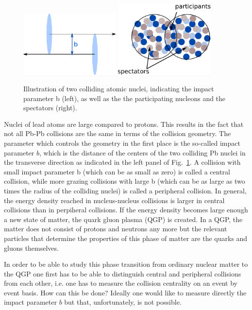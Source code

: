\documentclass{article}
\begin{document}
\begin{figure}[h]
	\centering
	\includegraphics[width=0.45\textwidth]{bParameter.pdf}
 	\includegraphics[width=0.45\textwidth]{2Nucleicolliding.pdf}
	\caption{Illustration of two colliding atomic nuclei, indicating the 
                 impact parameter b (left), as well as the the participating 
                 nucleons and the spectators (right).}
	\label{fig:Impactparameter}
\end{figure}

Nuclei of lead atoms are large compared to protons. This results in the fact
that not all Pb-Pb collisions are the same in terms of the collision geometry.
The parameter which controls the geometry in the first place is the so-called
impact parameter $b$, which is the distance of the centers of the two colliding
Pb nuclei in the transverse direction as indicated in the left panel of
Fig.~\ref{fig:Impactparameter}. A collision with small impact parameter b
(which can be as small as zero) is called a central collision, while more
grazing collisions with large b (which can be as large as two times the
radius of the colliding nuclei) is called a peripheral collision. 
In general, the energy density reached in nucleus-nucleus collisions is
larger in central collisions than in perpiheral collisions. If the energy
density becomes large enough a new state of matter, the quark gluon plasma
(QGP) is created. In a QGP, the matter does not consist of protons and 
neutrons any more but the relevant particles that determine the properties
of this phase of matter are the quarks and gluons themselves.

In order to be able to study this phase transition from ordinary nuclear
matter to the QGP one first has to be able to distinguish central and
peripheral collisions from each other, i.e. one has to measure the collision
centrality on an event by event basis. How can this be done? Ideally one
would like to measure directly the impact parameter $b$ but that, 
unfortunately, is not possible.
\end{document}
